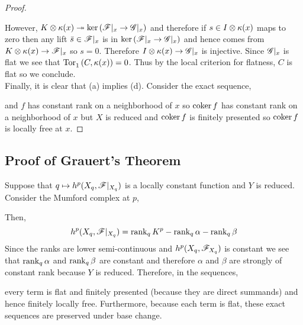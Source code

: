 \documentclass[12pt]{article}
\begin{document}
\begin{proof}
\begin{center}
\begin{tikzcd}
\end{tikzcd}
\end{center}
However, $K \ot \kappa(x) \onto \ker{(\F|_x \to \G|_x)}$ and therefore if $s \in I \ot \kappa(x)$ maps to zero then any lift $\bar{s} \in \F|_x$ is in $\ker{(\F|_x \to \G|_x)}$ and hence comes from $K \ot \kappa(x) \to \F|_x$ so $s = 0$. Therefore $I \ot \kappa(x) \to \G|_x$ is injective. Since $\G|_x$ is flat we see that $\Tor{}{1}{C}{\kappa(x)} = 0$. Thus by the local criterion for flatness, $C$ is flat so we conclude.
\bigskip\\
Finally, it is clear that (a) implies (d). Consider the exact sequence,
\begin{center}
\end{center}
and $f$ has constant rank on a neighborhood of $x$ so $\coker{f}$ has constant rank on a neighborhood of $x$ but $X$ is reduced and $\coker{f}$ is finitely presented so $\coker{f}$ is locally free at $x$.
\end{proof}

\subsection{Proof of Grauert's Theorem}

Suppose that $q \mapsto h^p(X_q, \F|_{X_q})$ is a locally constant function and $Y$ is reduced. 
\bigskip\\
Consider the Mumford complex at $p$, 
\begin{center}
\end{center}
Then,
\[ h^p(X_q, \F|_{X_q}) = \rank_q{K^p} - \rank_q{\alpha} - \rank_q{\beta} \]
Since the ranks are lower semi-continuous and $h^p(X_q, \F_{X_q})$ is constant we see that $\rank_q{\alpha}$ and $\rank_q{\beta}$ are constant and therefore $\alpha$ and $\beta$ are strongly of constant rank because $Y$ is reduced. Therefore, in the sequences,
\begin{center}
\end{center}
every term is flat and finitely presented (because they are direct summands) and hence finitely locally free. Furthermore, because each term is flat, these exact sequences are preserved under base change. 
\end{document}
